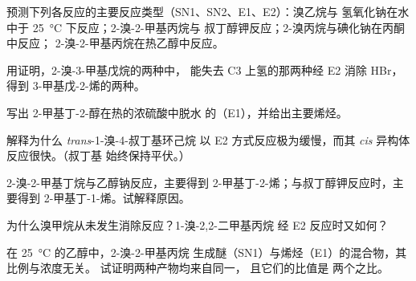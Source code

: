 \begin{exercise}[$\star$]\label{exo:b1:elimination:4}
预测下列各反应的主要反应类型（SN1、SN2、E1、E2）：溴乙烷与
氢氧化钠在水中于 \qty{25}{\celsius} 下反应；2-溴-2-甲基丙烷与
叔丁醇钾反应；2-溴丙烷与碘化钠在丙酮中反应；
2-溴-2-甲基丙烷在热乙醇中反应。
\end{exercise}

\begin{exercise}[$\star\star$]\label{exo:b1:elimination:5}
用证明，2-溴-3-甲基戊烷的两种中，
能失去 C3 上氢的那两种经 E2 消除 HBr，
得到 3-甲基戊-2-烯的两种。
\end{exercise}

\begin{exercise}[$\star\star$]\label{exo:b1:elimination:6}
写出 2-甲基丁-2-醇在热的浓硫酸中脱水
的（E1），并给出主要烯烃。
\end{exercise}

\begin{exercise}[$\star\star$]\label{exo:b1:elimination:7}
解释为什么 \textit{trans}-1-溴-4-叔丁基环己烷
以 E2 方式反应极为缓慢，而其 \textit{cis} 异构体反应很快。（叔丁基
始终保持平伏。）
\end{exercise}

\begin{exercise}[$\star\star$]\label{exo:b1:elimination:8}
2-溴-2-甲基丁烷与乙醇钠反应，主要得到
2-甲基丁-2-烯；与叔丁醇钾反应时，主要得到
2-甲基丁-1-烯。试解释原因。
\end{exercise}

\begin{exercise}[$\star\star$]\label{exo:b1:elimination:9}
为什么溴甲烷从未发生消除反应？1-溴-2,2-二甲基丙烷
经 E2 反应时又如何？
\end{exercise}

\begin{exercise}[$\star\star\star$]\label{exo:b1:elimination:10}
在 \qty{25}{\celsius} 的乙醇中，2-溴-2-甲基丙烷
生成醚（SN1）与烯烃（E1）的混合物，其比例与浓度无关。
试证明两种产物均来自同一，
且它们的比值是
两个之比。
\end{exercise}

